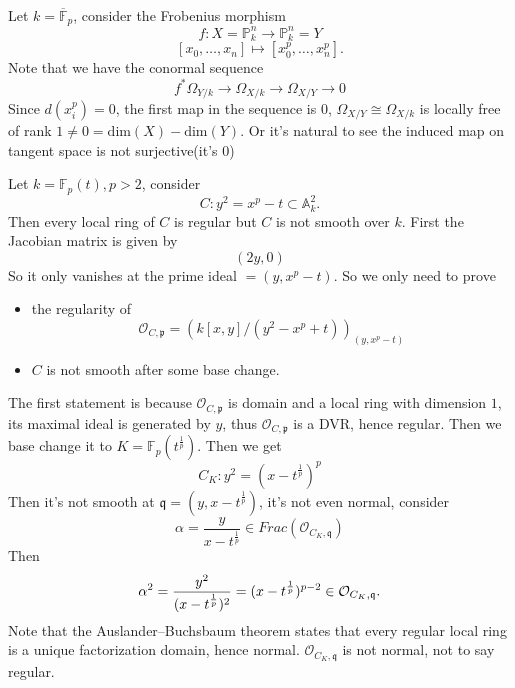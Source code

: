 \documentclass[../main.tex]{subfiles}
\begin{document}
\begin{example}
Let $k=\overline{\mathbb{F}}_{p}$, consider the Frobenius morphism
$$f:X=\mathbb{P}_{k}^{n}\rightarrow \mathbb{P}_{k}^{n}=Y$$
$$[x_{0},\dots, x_{n}]\mapsto [x_{0}^{p},\dots, x_{n}^{p}].$$
Note that we have the conormal sequence 
$$f^{*}\Omega_{Y/k}\rightarrow \Omega_{X/k}\rightarrow \Omega_{X/Y}\rightarrow 0$$
Since $d(x_{i}^{p})=0$, the first map in the sequence is $0$, $\Omega_{X/Y}\cong \Omega_{X/k}$ is locally free of rank $1\neq 0=\mathrm{dim}(X)-\mathrm{dim}(Y).$ Or it's natural to see the induced map on tangent space is not surjective(it's $0$)

\end{example}





\begin{remark}
\end{remark}



\begin{example}
Let $k=\mathbb{F}_{p}(t), p>2$, consider 
$$C:y^{2}=x^{p}-t \subset \mathbb{A}_{k}^{2}.$$
Then every local ring of $C$ is regular but $C$ is not smooth over $k$. First the Jacobian matrix is given by
$$(2y, 0)$$
So it only vanishes at the prime ideal $\mathfrak=(y, x^{p}-t)$. So we only need to prove
\begin{itemize}
\item the regularity of 
$$\mathcal{O}_{C,\mathfrak{p}}=(k[x,y]/(y^{2}-x^{p}+t))_{(y,x^{p}-t)}$$
\item $C$ is not smooth after some base change.
\end{itemize}
The first statement is because $\mathcal{O}_{C,\mathfrak{p}}$ is domain and a local ring with dimension $1$, its maximal ideal is generated by $y$, thus $\mathcal{O}_{C,\mathfrak{p}}$ is a DVR, hence regular. Then we base change it to $K=\mathbb{F}_{p}(t^{\frac{1}{p}})$. Then we get 
$$C_{K}: y^{2}=(x-t^{\frac{1}{p}})^{p}$$
Then it's not smooth at $\mathfrak{q}=(y,x-t^{\frac{1}{p}})$, it's not even normal, consider 
$$\alpha=\frac{y}{x-t^{\frac{1}{p}}}\in Frac(\mathcal{O}_{C_{K}, \mathfrak{q}})$$
Then $$\alpha^{2}=\frac{y^{2}}{(x-t^{\frac{1}{p}})^{2}}=(x-t^{\frac{1}{p}})^{p-2}\in \mathcal{O}_{C_{K},\frak{q}}.$$
Note that the Auslander–Buchsbaum theorem states that every regular local ring is a unique factorization domain, hence normal. $\mathcal{O}_{C_{K},\mathfrak{q}}$ is not normal, not to say regular.
\end{example}
\end{document}
